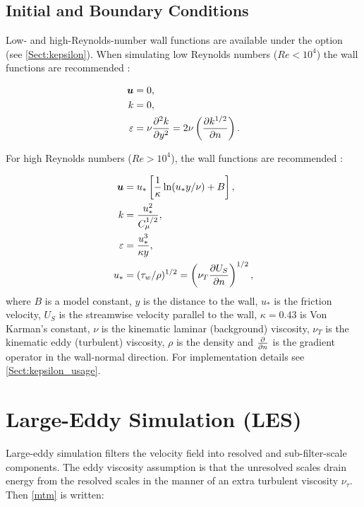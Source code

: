 \subsection{Initial and Boundary Conditions}

Low- and high-Reynolds-number wall functions are available under the option \linebreak {} (see \ref{Sect:kepsilon}). When simulating low Reynolds numbers ($Re<10^4$) the  wall functions are recommended \citep{wilcox1998turbulence}:

\begin{align}
\bmu &= 0, \label{ubc1}\\
k &= 0, \label{kbc1}\\
\epsilon &= \nu \ppxx[y]{k} = 2 \nu \left ( \ppx[n]{k^{1/2}} \right ). \label{epsbc1}
\end{align}

For high Reynolds numbers ($Re>10^4$), the  wall functions are recommended \citep{wilcox1998turbulence}:

\begin{align}
\bmu &= u_* \left [ \frac{1}{\kappa} \ln (u_* y / \nu) + B \right ], \label{ubc2}\\
k &= \frac{u_*^2}{C_{\mu}^{1/2}}, \label{kbc2}\\
\epsilon &= \frac{u_*^3}{\kappa y}, \label{epsbc2}\\
u_* &= (\tau_w / \rho)^{1/2} = \left ( \nu_T \ppx[n]{U_S} \right )^{1/2}, \label{ustar}
\end{align}
where $B$ is a model constant, $y$ is the distance to the wall, $u_*$ is the friction velocity, $U_S$ is the streamwise velocity parallel to the wall, $\kappa=0.43$ is Von Karman's constant, $\nu$ is the kinematic laminar (background) viscosity, $\nu_T$ is the kinematic eddy (turbulent) viscosity, $\rho$ is the density and $\ppx[n]{}$ is the gradient operator in the wall-normal direction. For implementation details see \ref{Sect:kepsilon_usage}.


\section{Large-Eddy Simulation (LES)}\label{Sect:LES}

Large-eddy simulation filters the velocity field into resolved and sub-filter-scale components. The eddy viscosity assumption is that the unresolved scales drain energy from the resolved scales in the manner of an extra turbulent viscosity $\nu_\tau$. Then \eqref{mtm} is written:

